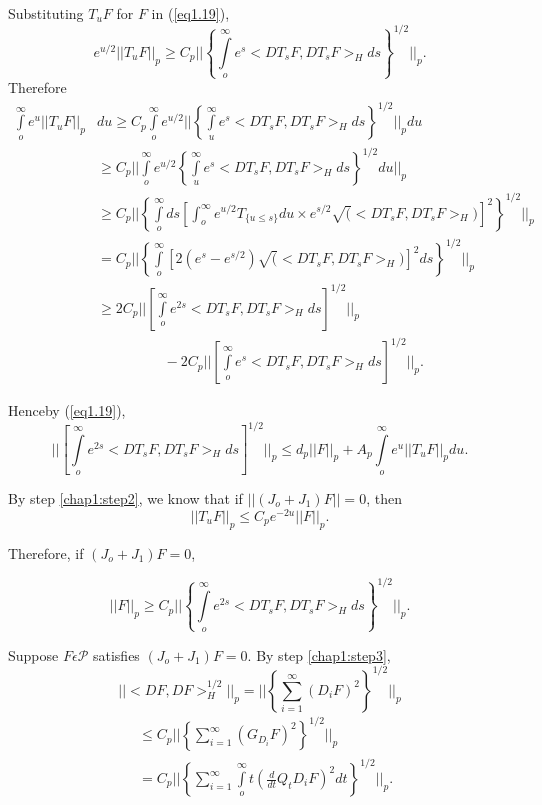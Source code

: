   Substituting $T_uF$ for $F$ in (\ref{eq1.19}),
$$
e^{u/2} || T_uF || _p \geq C_p || \left\{ \int \limits ^ \infty
_oe^{s} < DT_{s} F, DT_{s} F >_H ds \right\}^{1/2} ||_p. 
$$  
  Therefore
{\fontsize{9pt}{11pt}\selectfont
\begin{align*}
  \int \limits^ \infty _o   e^u || T_u F ||_p & du\geq C_p
  \int\limits^\infty_o e^{u/2}|| \left\{ \int \limits ^ \infty _u e^{s}<
    DT_{s}F, DT_{s} F >_H ds \right\}^{1/2} ||_p du\\ 
  &\geq C_p || \int \limits^\infty_o e^{u/2} \left\{ \int \limits^
  \infty_u e^{s} < DT_{s}F, DT_{s} F>_H ds \right\}^{1/2} du||_p \\ 
  & \geq C_p || \left\{ \int\limits^\infty_o ds \left[ \int^\infty_o
    e^{u/2} T_{\{u \leq s\}} du \times e^{s/2} \surd (< DT_sF, DT_s
    F>_H)\right]^2 \right\}^{1/2}||_p\\
  &= C_p || \left\{ \int \limits^\infty _o \left[2(e^{s} - e^{s/2}) \surd
    ( < DT_{s} F, DT_s F >_H)\right]^2 ds \right\}^{1/2} ||_p \\ 
  & \geq 2C_p || \left[ \int \limits ^ \infty _o e^{2s} < DT_{s} F,DT_s F
    >_H ds \right]^{1/2} ||_p\\ 
  & \hspace{2cm}-2C_p || \left[ \int \limits ^ \infty _o e^{s} <
    DT_{s} F, DT_s F >_H ds \right]^{1/2} ||_p. 
\end{align*}}\relax

  
  Hence\pageoriginale by (\ref{eq1.19}),
  $$
  || \left[ \int \limits ^ \infty _o e^{2s}< DT_{s} F, DT_s F>_Hds
  \right]^{1/2} ||_p \leq d_p || F ||_p + A_p \int \limits ^ \infty _o e^u
  || T_u F || _p du.
  $$ 
  
By step \ref{chap1:step2}, we know that if $|| (J_o + J_1) F
  || = 0$, then  
 $$
 || T_u F || _p \leq C_p e^{-2u} || F ||_p.
 $$
  
 Therefore, if $(J_o+J_1)F=0$,
  
 \begin{equation*}
    || F ||_p \geq C_p || \left\{ \int \limits ^\infty _o e^{2s} < DT_s F,
    DT_s F >_H ds \right\} ^{1/2}||_p. \tag{1.20}\label{eq1.20} 
 \end{equation*}
  
  Suppose $F \epsilon  \mathcal{P}$ satisfies $(J_o + J_1) F =0 $. By
  step \ref{chap1:step3},  
  $$
  || <DF, DF>_H^{1/2} || _p = || \left\{ \sum ^\infty _{i=1} (D_iF)^2
  \right\}^{1/2} ||_p 
  $$  
\begin{align*}
  & \leq C_p || \left\{ \sum^\infty _{i=1} (G_{D_i}F)^2 \right\}^{1/2} ||_p\\
  &= C_p || \left\{ \sum ^\infty _{i=1} \int \limits ^\infty _o t
  (\frac{d}{dt} Q_t D_i F)^2 dt \right\}^{1/2} ||_p . \tag{*} 
\end{align*}
	
